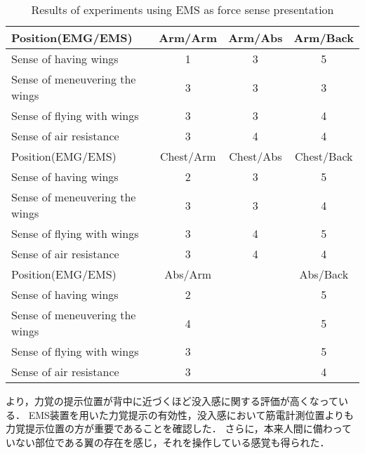     \begin{table}[t]
        \begin{center}
            \caption{Results of experiments using EMS as force sense presentation}
            \scalebox{0.75}
            {
                \begin{tabular}{l|c|c|c}
                    \hline
                    Position(EMG/EMS) & Arm/Arm & Arm/Abs & Arm/Back \\\hline
                    Sense of having wings & 1 & 3 & 5 \\
                    Sense of meneuvering the wings & 3 & 3 & 3\\
                    Sense of flying with wings & 3 & 3 & 4 \\
                    Sense of air resistance & 3 & 4 & 4 \\\hline\hline

                    Position(EMG/EMS) & Chest/Arm & Chest/Abs & Chest/Back \\\hline
                    Sense of having wings & 2 & 3 & 5 \\
                    Sense of meneuvering the wings & 3& 3 & 4\\
                    Sense of flying with wings & 3 & 4 & 5 \\                        
                    Sense of air resistance & 3 & 4 & 4 \\\hline\hline

                    Position(EMG/EMS) & Abs/Arm & & Abs/Back  \\\hline                        
                    Sense of having wings & 2 && 5 \\                        
                    Sense of meneuvering the wings & 4 && 5 \\
                    Sense of flying with wings & 3 && 5 \\
                    Sense of air resistance & 3 && 4\\\hline\hline
                \end{tabular}
            }
        \end{center}
    \end{table}
    

    より，力覚の提示位置が背中に近づくほど没入感に関する評価が高くなっている．
    EMS装置を用いた力覚提示の有効性，没入感において筋電計測位置よりも力覚提示位置の方が重要であることを確認した．
    さらに，本来人間に備わっていない部位である翼の存在を感じ，それを操作している感覚も得られた．


